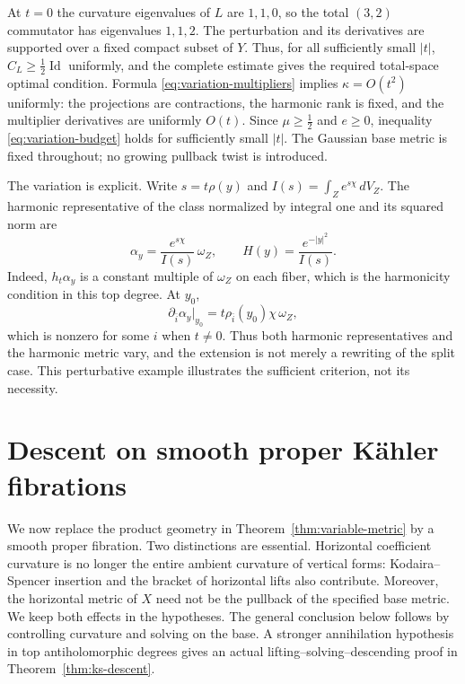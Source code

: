 \documentclass[11pt,reqno]{amsart}
\numberwithin{equation}{section}
\theoremstyle{definition}
\theoremstyle{remark}
\newcommand{\Id}{\operatorname{Id}}
\begin{document}
At $t=0$ the curvature eigenvalues of $L$ are $1,1,0$, so the total $(3,2)$ commutator has eigenvalues $1,1,2$. The perturbation and its derivatives are supported over a fixed compact subset of $Y$. Thus, for all sufficiently small $|t|$, $C_L\geq\tfrac12\Id$ uniformly, and the complete estimate gives the required total-space optimal condition. Formula \eqref{eq:variation-multipliers} implies $\kappa=O(t^2)$ uniformly: the projections are contractions, the harmonic rank is fixed, and the multiplier derivatives are uniformly $O(t)$. Since $\mu\geq\tfrac12$ and $e\geq0$, inequality \eqref{eq:variation-budget} holds for sufficiently small $|t|$. The Gaussian base metric is fixed throughout; no growing pullback twist is introduced.

The variation is explicit. Write $s=t\rho(y)$ and $I(s)=\int_Ze^{s\chi}\,dV_Z$. The harmonic representative of the class normalized by integral one and its squared norm are
\[
 \alpha_y=\frac{e^{s\chi}}{I(s)}\,\omega_Z,
 \qquad H(y)=\frac{e^{-|y|^2}}{I(s)}.
\]
Indeed, $h_t\alpha_y$ is a constant multiple of $\omega_Z$ on each fiber, which is the harmonicity condition in this top degree. At $y_0$,
\[
 \partial_{\bar i}\alpha_y\big|_{y_0}
        =t\rho_{\bar i}(y_0)\chi\,\omega_Z,
\]
which is nonzero for some $i$ when $t\ne0$. Thus both harmonic representatives and the harmonic metric vary, and the extension is not merely a rewriting of the split case. This perturbative example illustrates the sufficient criterion, not its necessity.

\section{Descent on smooth proper K\"ahler fibrations}\label{sec:variation}

We now replace the product geometry in Theorem~\ref{thm:variable-metric} by a smooth proper fibration. Two distinctions are essential. Horizontal coefficient curvature is no longer the entire ambient curvature of vertical forms: Kodaira--Spencer insertion and the bracket of horizontal lifts also contribute. Moreover, the horizontal metric of $X$ need not be the pullback of the specified base metric. We keep both effects in the hypotheses. The general conclusion below follows by controlling curvature and solving on the base. A stronger annihilation hypothesis in top antiholomorphic degrees gives an actual lifting--solving--descending proof in Theorem~\ref{thm:ks-descent}.
\end{document}

